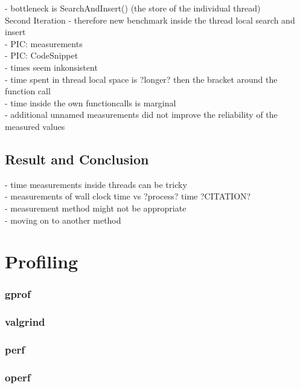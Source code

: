 - bottleneck is SearchAndInsert() (the store of the individual thread)\\

Second Iteration
- therefore new benchmark inside the thread local search and insert\\
- PIC: measurements\\
- PIC: CodeSnippet\\
- times seem inkonsistent\\
- time spent in thread local space is ?longer? then the bracket around the function call\\
- time inside the own functioncalls is marginal\\
- additional unnamed measurements did not improve the reliability of the measured values\\

\subsection{Result and Conclusion}
- time measurements inside threads can be tricky\\
- measurements of wall clock time vs ?process? time ?CITATION?\\
- measurement method might not be appropriate \\
- moving on to another method\\

\section{Profiling}
\subsubsection{gprof}
\subsubsection{valgrind}
\subsubsection{perf}
\subsubsection{operf}
